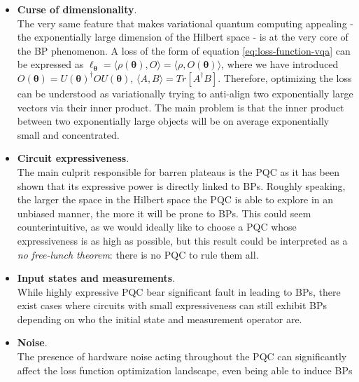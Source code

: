 \begin{itemize}
    \item \textbf{Curse of dimensionality}.\\
    The very same feature that makes variational quantum computing appealing - the exponentially large dimension
    of the Hilbert space - is at the very core of the BP phenomenon.
    A loss of the form of equation \ref{eq:loss-function-vqa} can be expressed as 
    $\ell_{\bm{\theta}} = \langle \rho(\bm{\theta}), O \rangle = \langle \rho, O(\bm{\theta}) \rangle$, where we have
    introduced $O(\bm{\theta}) = U(\bm{\theta})^{\dagger} O U(\bm{\theta})$, $\langle A, B \rangle = Tr[A^{\dagger}B]$.
    Therefore, optimizing the loss can be understood as variationally trying to anti-align two exponentially large 
    vectors via their inner product.
    The main problem is that the inner product between two exponentially large objects will be on average exponentially
    small and concentrated.

    \item \textbf{Circuit expressiveness}.\\
    The main culprit responsible for barren plateaus is the PQC as it has been shown \cite{Holmes_2022} that 
    its expressive power is directly linked to BPs.
    Roughly speaking, the larger the space in the Hilbert space the PQC is able to explore in an unbiased manner, 
    the more it will be prone to BPs.
    This could seem counterintuitive, as we would ideally like to choose a PQC whose expressiveness is as high as 
    possible, but this result could be interpreted as a \textit{no free-lunch theorem}: there is no PQC to rule them
    all.\\
    
    \item \textbf{Input states and measurements}.\\
    While highly expressive PQC bear significant fault in leading to BPs, there exist cases where circuits with 
    small expressiveness can still exhibit BPs depending on who the initial state and measurement operator are.

    \item \textbf{Noise}.\\
    The presence of hardware noise acting throughout the PQC can significantly affect the loss function optimization
    landscape, even being able to induce BPs \cite{Stilck_Fran_a_2021, Wang_2021}
\end{itemize}



